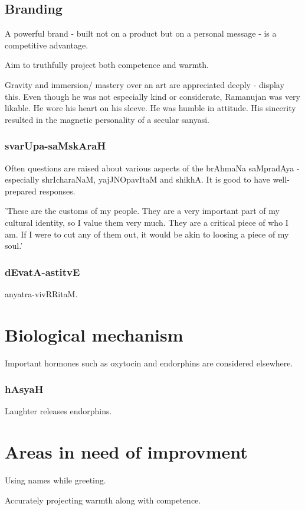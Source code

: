 \documentclass[oneside, article]{memoir}
\begin{document}
\section{Branding}
A powerful brand - built not on a product but on a personal message - is a competitive advantage.

Aim to truthfully project both competence and warmth.

Gravity and immersion/ mastery over an art are appreciated deeply - display this. Even though he was not especially kind or considerate, Ramanujan was very likable. He wore his heart on his sleeve. He was humble in attitude. His sincerity resulted in the magnetic personality of a secular sanyasi.

\subsection{svarUpa-saMskAraH}
Often questions are raised about various aspects of the brAhmaNa saMpradAya - especially shrIcharaNaM, yajJNOpavItaM and shikhA. It is good to have well-prepared responses.

'These are the customs of my people. They are a very important part of my cultural identity, so I value them very much. They are a critical piece of who I am. If I were to cut any of them out, it would be akin to loosing a piece of my soul.'

\subsection{dEvatA-astitvE}
anyatra-vivRRitaM.

\chapter{Biological mechanism}
Important hormones such as oxytocin and endorphins are considered elsewhere.

\subsection{hAsyaH}
Laughter releases endorphins.
 

\chapter{Areas in need of improvment}
Using names while greeting.

Accurately projecting warmth along with competence.
\end{document}
